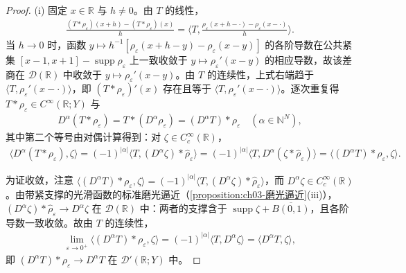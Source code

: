 \documentclass[../../main.tex]{subfiles}%
\begin{document}
\begin{proof}
(i) 固定 $x\in\mathbb{R}$ 与 $h\neq0$。由 $T$ 的线性，
\begin{align*}
\frac{(T*\rho_\varepsilon)(x+h)-(T*\rho_\varepsilon)(x)}{h}=\Big\langle T,\frac{\rho_\varepsilon(x+h-\cdot)-\rho_\varepsilon(x-\cdot)}{h}\Big\rangle .
\end{align*}
当 $h\to0$ 时，函数 $y\mapsto h^{-1}[\rho_\varepsilon(x+h-y)-\rho_\varepsilon(x-y)]$ 的各阶导数在公共紧集 $[x-1,x+1]-\operatorname{supp}\rho_\varepsilon$ 上一致收敛于 $y\mapsto\rho_\varepsilon'(x-y)$ 的相应导数，故该差商在 $\mathcal{D}(\mathbb{R})$ 中收敛于 $y\mapsto\rho_\varepsilon'(x-y)$。由 $T$ 的连续性，上式右端趋于 $\langle T,\rho_\varepsilon'(x-\cdot)\rangle$，即 $(T*\rho_\varepsilon)'(x)$ 存在且等于 $\langle T,\rho_\varepsilon'(x-\cdot)\rangle$。逐次重复得 $T*\rho_\varepsilon\in C^\infty(\mathbb{R};Y)$ 与
\begin{align*}
D^\alpha(T*\rho_\varepsilon)=T*(D^\alpha\rho_\varepsilon)=(D^\alpha T)*\rho_\varepsilon\quad(\alpha\in\mathbb{N}^N),
\end{align*}
其中第二个等号由对偶计算得到：对 $\zeta\in C_c^\infty(\mathbb{R})$，
\begin{align*}
\langle D^\alpha(T*\rho_\varepsilon),\zeta\rangle=(-1)^{|\alpha|}\langle T,(D^\alpha\zeta)*\hat\rho_\varepsilon\rangle=(-1)^{|\alpha|}\langle T,D^\alpha(\zeta*\hat\rho_\varepsilon)\rangle=\langle(D^\alpha T)*\rho_\varepsilon,\zeta\rangle .
\end{align*}

为证收敛，注意 $\langle(D^\alpha T)*\rho_\varepsilon,\zeta\rangle=(-1)^{|\alpha|}\langle T,(D^\alpha\zeta)*\hat\rho_\varepsilon\rangle$，而 $D^\alpha\zeta\in C_c^\infty(\mathbb{R})$。由带紧支撑的光滑函数的标准磨光逼近（\cref{proposition:ch03-磨光逼近}(iii)），$(D^\alpha\zeta)*\hat\rho_\varepsilon\to D^\alpha\zeta$ 在 $\mathcal{D}(\mathbb{R})$ 中：两者的支撑含于 $\operatorname{supp}\zeta+\overline{B(0,1)}$，且各阶导数一致收敛。故由 $T$ 的连续性，
\begin{align*}
\lim_{\varepsilon\to0^+}\langle(D^\alpha T)*\rho_\varepsilon,\zeta\rangle=(-1)^{|\alpha|}\langle T,D^\alpha\zeta\rangle=\langle D^\alpha T,\zeta\rangle ,
\end{align*}
即 $(D^\alpha T)*\rho_\varepsilon\to D^\alpha T$ 在 $\mathcal{D}'(\mathbb{R};Y)$ 中。


\end{proof}
\end{document}
